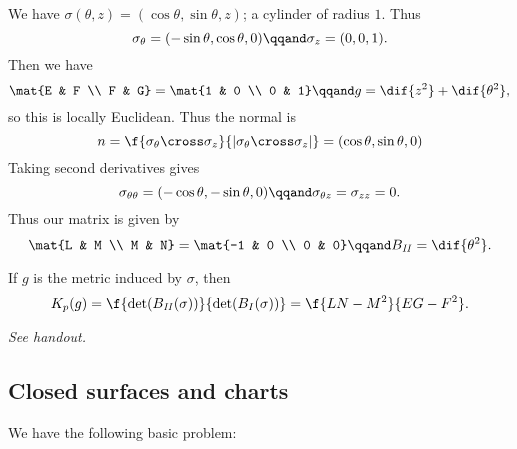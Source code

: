 \begin{example}
	We have $\sigma(\theta,z) = (\cos \theta, \sin\theta, z)$; a cylinder of radius $1$. Thus
	\begin{equation*}
		\sigma_\theta=(-\sin \theta, \cos\theta, 0) \qqand
		\sigma_z= (0,0,1).
	\end{equation*}
	Then we have
	\begin{equation*}
		\mat{E & F \\ F & G} = \mat{1 & 0 \\ 0 & 1} \qqand
		g =\dif{z^2} + \dif{\theta^2},
	\end{equation*}
	so this is locally Euclidean. Thus the normal is
	\begin{equation*}
		\nn
		= \f{\sigma_\theta \cross \sigma_z}{\left\vert \sigma_{\theta} \cross \sigma_z \right\vert}
		= (\cos\theta, \sin\theta, 0)
	\end{equation*}
	Taking second derivatives gives
	\begin{equation*}
		\sigma_{\theta\theta} = (-\cos\theta, -\sin\theta,0) \qqand
		\sigma_{\theta z} = \sigma_{zz} = 0.
	\end{equation*}
	Thus our matrix is given by
	\begin{equation*}
		\mat{L & M \\ M & N} = \mat{-1 & 0 \\ 0 & 0} \qqand
		B_{\text{\emph{II}}} = \dif{\theta^2}.
	\end{equation*}
\end{example}

\begin{theorem}
	 If $g$ is the metric induced by $\sigma$, then
	\begin{equation*}
		K_p(g)
		= \f{\det(B_{\text{\emph{II}}}(\sigma))}{\det(B_I(\sigma))}
		= \f{LN-M^2}{EG-F^2}.
	\end{equation*}
\end{theorem}

\emph{See handout.}



\subsection{Closed surfaces and charts} %
\label{sub:closed_surfaces_and_charts}

We have the following basic problem:

